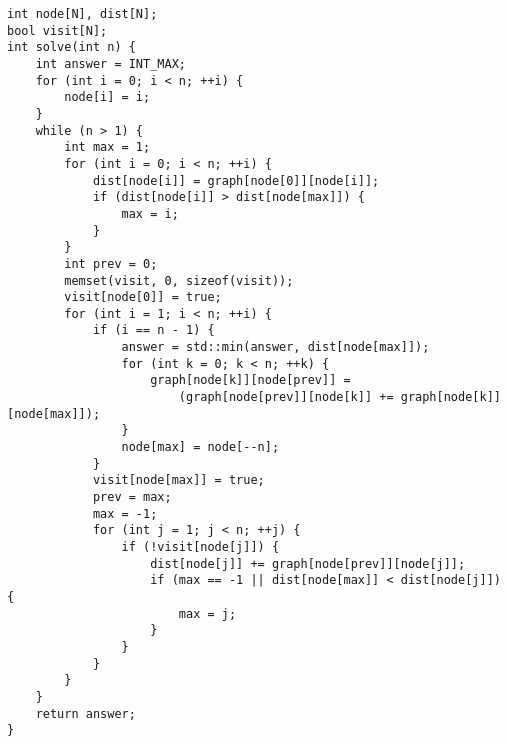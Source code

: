 \begin{lstlisting}
int node[N], dist[N];
bool visit[N];
int solve(int n) {
    int answer = INT_MAX;
    for (int i = 0; i < n; ++i) {
        node[i] = i;
    }
    while (n > 1) {
        int max = 1;
        for (int i = 0; i < n; ++i) {
            dist[node[i]] = graph[node[0]][node[i]];
            if (dist[node[i]] > dist[node[max]]) {
                max = i;
            }
        }
        int prev = 0;
        memset(visit, 0, sizeof(visit));
        visit[node[0]] = true;
        for (int i = 1; i < n; ++i) {
            if (i == n - 1) {
                answer = std::min(answer, dist[node[max]]);
                for (int k = 0; k < n; ++k) {
                    graph[node[k]][node[prev]] =
                        (graph[node[prev]][node[k]] += graph[node[k]][node[max]]);
                }
                node[max] = node[--n];
            }
            visit[node[max]] = true;
            prev = max;
            max = -1;
            for (int j = 1; j < n; ++j) {
                if (!visit[node[j]]) {
                    dist[node[j]] += graph[node[prev]][node[j]];
                    if (max == -1 || dist[node[max]] < dist[node[j]]) {
                        max = j;
                    }
                }
            }
        }
    }
    return answer;
}
\end{lstlisting}
